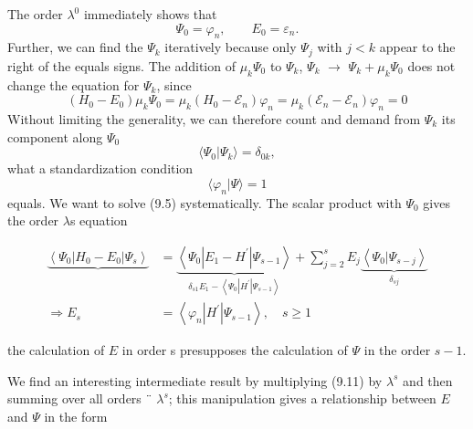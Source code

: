 The order $\lambda^0$ immediately shows that
\begin{equation}
    \Psi_0 = \varphi_n,\qquad E_0=\varepsilon_n.
\end{equation}
Further, we can find the $\Psi_k$ iteratively because only $\Psi_j$ with $j <k$ appear to the right of the equals signs. The addition of $\mu_k\Psi_0$ to $\Psi_k$, $\Psi_k$ $\rightarrow$ $\Psi_k+\mu_k \Psi_0$  does not change the equation for $\Psi_k$, since
\begin{equation}
    \left(H_{0}-E_{0}\right) \mu_{k} \Psi_{0}=\mu_{k}\left(H_{0}-\mathcal{E}_{n}\right) \varphi_{n}=\mu_{k}\left(\mathcal{E}_{n}-\mathcal{E}_{n}\right) \varphi_{n}=0
    \end{equation}
Without limiting the generality, we can therefore count and demand from $\Psi_k$ its component along $\Psi_0$
\begin{equation}
    \langle\Psi_0|\Psi_k\rangle =\delta_{0k},
\end{equation}
what a standardization condition
\begin{equation}
    \langle\varphi_n|\Psi\rangle = 1
\end{equation}
equals. We want to solve (9.5) systematically. The scalar product with $\Psi_0$ gives the order $\lambda$s equation

\begin{align} \underbrace{\left\langle\Psi_{0}\left|H_{0}-E_{0}\right| \Psi_{s}\right\rangle} &=\underbrace{\left\langle\Psi_{0}\left|E_{1}-H^{\prime}\right| \Psi_{s-1}\right\rangle}_{\delta_{s 1} E_{1}-\left\langle\Psi_{0}\left|H^{\prime}\right| \Psi_{s-1}\right\rangle}+\sum_{j=2}^{s} E_{j} \underbrace{\left\langle\Psi_{0} | \Psi_{s-j}\right\rangle}_{\delta_{s j}} \\ 
 \Rightarrow E_{s} &=\left\langle\varphi_{n}\left|H^{\prime}\right| \Psi_{s-1}\right\rangle, \quad s \geq 1 \end{align}

the calculation of $E$ in order s presupposes the calculation of $\Psi$ in the order $s - 1$.

We find an interesting intermediate result by multiplying (9.11) by $\lambda^s$ and then summing over all orders ¨ $\lambda^s$; this manipulation gives a relationship between $E$ and $\Psi$ in the form


